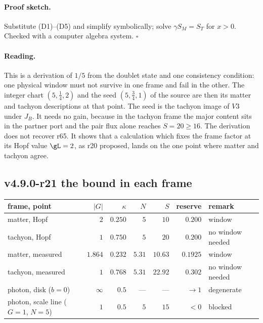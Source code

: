 \paragraph{Proof sketch.}
Substitute (D1)--(D5) and simplify symbolically; solve \(\gamma S_M=S_T\) for \(x>0\).  Checked with a computer algebra system.  \(\square\)

\paragraph{Reading.}
This is a derivation of \(1/5\) from the doublet state and one consistency condition: one physical window must not survive in
one frame and fail in the other.  The integer chart \((5,\tfrac14,2)\) and the seed \((5,\tfrac34,1)\) of the source are then its
matter and tachyon descriptions at that point.  The seed is the tachyon image of \(V3\) under \(J_B\).  It needs no gain, because
in the tachyon frame the major content sits in the partner port and the pair flux alone reaches \(S=20\ge16\).  The derivation
does not recover r65.  It shows that a calculation which fixes the frame factor at its Hopf value \(\gL=2\), as r20 proposed,
lands on the one point where matter and tachyon agree.

\subsection*{v4.9.0-r21 the bound in each frame}
\label{subsec:v490-r21-per-frame}

\begin{center}
\small
\begin{tabular}{@{}>{\raggedright\arraybackslash}p{}rrrrrl@{}}
\toprule
frame, point & \(|G|\) & \(\kappa\) & \(N\) & \(S\) & reserve & remark\\
\midrule
matter, Hopf & \(2\) & \(0.250\) & \(5\) & \(10\) & \(0.200\) & window\\
tachyon, Hopf & \(1\) & \(0.750\) & \(5\) & \(20\) & \(0.200\) & no window needed\\
matter, measured & \(1.864\) & \(0.232\) & \(5.31\) & \(10.63\) & \(0.1925\) & window\\
tachyon, measured & \(1\) & \(0.768\) & \(5.31\) & \(22.92\) & \(0.302\) & no window needed\\
photon, disk (\(b=0\)) & \(\infty\) & \(0.5\) & --- & --- & \(\to1\) & degenerate\\
photon, scale line (\(G=1\), \(N=5\)) & \(1\) & \(0.5\) & \(5\) & \(15\) & \(<0\) & blocked\\
\bottomrule
\end{tabular}
\end{center}


